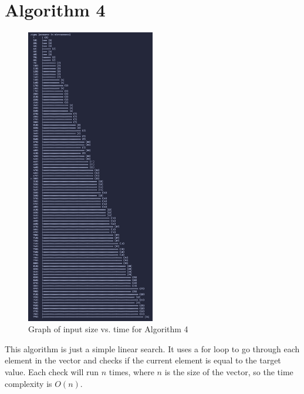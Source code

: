 \documentclass{article}
\begin{document}
\section*{Algorithm 4}
\begin{figure}[H]
    \centering
    \includegraphics[width=0.5\textwidth]{./images/algo4.png}
    \caption{Graph of input size vs. time for Algorithm 4}
\end{figure}

This algorithm is just a simple linear search.
It uses a for loop to go through each element in the vector and checks if the current element is equal to the target value.
Each check will run $n$ times, where $n$ is the size of the vector, so the time complexity is $O(n)$.
\end{document}
